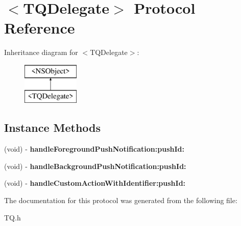\hypertarget{protocol_t_q_delegate-p}{}\section{$<$T\+Q\+Delegate$>$ Protocol Reference}
\label{protocol_t_q_delegate-p}
Inheritance diagram for $<$T\+Q\+Delegate$>$\+:\begin{figure}[H]
\begin{center}
\leavevmode
\includegraphics[height=2.000000cm]{protocol_t_q_delegate-p}
\end{center}
\end{figure}
\subsection*{Instance Methods}
\begin{DoxyCompactItemize}
\item 
\hypertarget{protocol_t_q_delegate-p_a34747cffd0d6cc29542fbcd96c92d470}{}(void) -\/ {\bfseries handle\+Foreground\+Push\+Notification\+:push\+Id\+:}\label{protocol_t_q_delegate-p_a34747cffd0d6cc29542fbcd96c92d470}

\item 
\hypertarget{protocol_t_q_delegate-p_a2d73eca46f921692a73671d3f330be15}{}(void) -\/ {\bfseries handle\+Background\+Push\+Notification\+:push\+Id\+:}\label{protocol_t_q_delegate-p_a2d73eca46f921692a73671d3f330be15}

\item 
\hypertarget{protocol_t_q_delegate-p_a10a20e42ddc351e3a62ee90e7c8830f5}{}(void) -\/ {\bfseries handle\+Custom\+Action\+With\+Identifier\+:push\+Id\+:}\label{protocol_t_q_delegate-p_a10a20e42ddc351e3a62ee90e7c8830f5}

\end{DoxyCompactItemize}


The documentation for this protocol was generated from the following file\+:\begin{DoxyCompactItemize}
\item 
T\+Q.\+h\end{DoxyCompactItemize}
